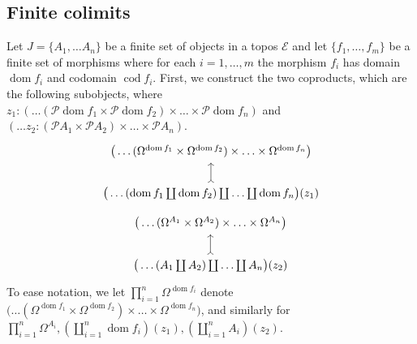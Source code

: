 \documentclass{tac}
\newcommand{\call}[1]{\mathcal{#1}}
\begin{document}
	\subsection{Finite colimits}\label{sec:colimits}
	Let $J = \lbrace A_1,\hdots A_n\rbrace$ be a finite set of objects in a topos $\call{E}$ and let $\lbrace f_1,\hdots, f_m\rbrace$ be a finite set of morphisms where for each $i=1,\hdots, m$ the morphism $f_i$ has domain $\operatorname{dom}f_i$ and codomain $\operatorname{cod}f_i$.
	First, we construct the two coproducts, which are the following subobjects, where $z_1 : (\hdots(\call{P} \operatorname{dom}f_1 \times \call{P} \operatorname{dom}f_2) \times \hdots \times \call{P} \operatorname{dom}f_n)$ and $( \hdots z_2 : (\call{P} A_1 \times \call{P} A_2 ) \times \hdots \times \call{P}A_n)$.
	\begin{equation}
		\begin{tikzcd}
			\big(\hdots (\Omega^{\operatorname{dom}f_1} \times \Omega^{\operatorname{dom}f_2}) \times \hdots \times \Omega^{\operatorname{dom}f_n}\big)\\
			\big( \hdots ( \operatorname{dom}f_1 \coprod \operatorname{dom}f_2) \coprod \hdots \coprod \operatorname{dom}f_n\big)(z_1)\arrow[u,rightarrowtail]
			\end{tikzcd}
		\end{equation}
	\begin{equation}
		\begin{tikzcd}
			\big(\hdots (\Omega^{A_1} \times \Omega^{A_2}) \times \hdots \times \Omega^{A_n}\big)\\
			\big( \hdots ( A_1 \coprod A_2) \coprod \hdots \coprod A_n\big)(z_2)\arrow[u,rightarrowtail]
		\end{tikzcd}
	\end{equation}
	To ease notation, we let $\prod_{i = 1}^n \Omega^{\operatorname{dom}f_i}$ denote $\big(\hdots (\Omega^{\operatorname{dom}f_1} \times \Omega^{\operatorname{dom}f_2}) \times \hdots \times \Omega^{\operatorname{dom}f_n}\big)$, and similarly for $\prod_{i = 1}^n\Omega^{A_i}, (\coprod_{i = 1}^n \operatorname{dom}f_i)(z_1), (\coprod_{i = 1}^n A_i)(z_2)$.
	
\end{document}
